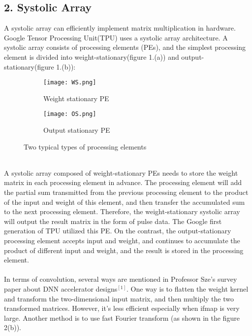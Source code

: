 \documentclass[12pt]{article}
\begin{document}
\subsection*{2. Systolic Array}
A systolic array can efficiently implement matrix multiplication in hardware. Google Tensor Processing Unit(TPU) uses a systolic array architecture. A systolic array consists of processing elements (PEs), and the simplest processing element is divided into weight-stationary(figure 1.(a)) and output-stationary(figure 1.(b)): \\
\begin{figure}[h]
\begin{center}
\begin{subfigure}{0.3\textwidth}
\begin{center}
\texttt{[image: WS.png]} 
\caption{Weight stationary PE}
\label{fig:subim1}
\end{center}
\end{subfigure}
\begin{subfigure}{0.3\textwidth}
\begin{center}
\texttt{[image: OS.png]}
\caption{Output stationary PE}
\label{fig:subim2}
\end{center}
\end{subfigure}
\end{center}
\caption{Two typical types of processing elements}
\label{fig:image2}
\end{figure}
\\
A systolic array composed of weight-stationary PEs needs to store the weight matrix in each processing element in advance. The processing element will add the partial sum transmitted from the previous processing element to the product of the input and weight of this element, and then transfer the accumulated sum to the next processing element. Therefore, the weight-stationary systolic array will output the result matrix in the form of pulse data. The Google first generation of TPU utilized this PE. On the contrast, the output-stationary processing element accepts input and weight, and continues to accumulate the product of different input and weight, and the result is stored in the processing element.\\
\\
In terms of convolution, several ways are mentioned in Professor Sze's survey paper about DNN accelerator designs$^{[1]}$. One way is to flatten the weight kernel and transform the two-dimensional input matrix, and then multiply the two transformed matrices. However, it's less efficient especially when ifmap is very large. Another method is to use fast Fourier transform (as shown in the figure 2(b)).\\
\end{document}
